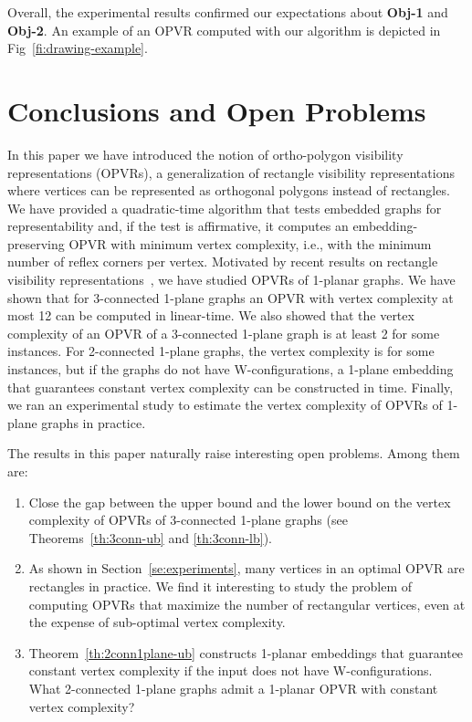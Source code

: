 \documentclass{article}
\newcommand{\opvr}{OPVR\xspace}
\begin{document}
Overall, the experimental results confirmed our expectations about {\bf Obj-1} and {\bf Obj-2}. 
An example of an \opvr computed with our algorithm is depicted in Fig~\ref{fi:drawing-example}.   



\section{Conclusions and Open Problems}\label{se:conclusions}

In this paper we have introduced the notion of ortho-polygon visibility representations (\opvr{s}), a generalization of rectangle visibility representations where vertices can be represented as orthogonal polygons instead of rectangles. We have provided a quadratic-time algorithm that tests embedded graphs for representability and, if the test is affirmative, it computes an embedding-preserving \opvr with minimum vertex complexity, i.e., with the minimum number of reflex corners per vertex. Motivated by recent results on rectangle visibility representations~\cite{SoCG}, we have studied \opvr{s} of 1-planar graphs. We have shown that for 3-connected 1-plane graphs an \opvr with vertex complexity at most 12 can be computed in linear-time. We also showed that the vertex complexity of an \opvr of a 3-connected 1-plane graph is at least 2 for some instances. For 2-connected 1-plane graphs, the vertex complexity is  for some instances, but if the graphs do not have W-configurations, a 1-plane embedding that guarantees constant vertex complexity can be constructed in  time. Finally, we ran an experimental study to estimate the vertex complexity of \opvr{s} of 1-plane graphs in practice.

The results in this paper naturally raise interesting open problems. Among them are: 

\begin{enumerate}
\item Close the gap between the upper bound and the lower bound on the vertex complexity of {\opvr}s of 3-connected 1-plane graphs (see Theorems~\ref{th:3conn-ub} and \ref{th:3conn-lb}). 
\item As shown in Section~\ref{se:experiments}, many vertices in an optimal \opvr are rectangles in practice. We find it interesting to study the problem of computing {\opvr}s that maximize the number of rectangular vertices, even at the expense of sub-optimal vertex complexity. 
\item Theorem~\ref{th:2conn1plane-ub} constructs 1-planar embeddings that guarantee constant vertex complexity if the input does not have W-configurations. What 2-connected 1-plane graphs admit a 1-planar {\opvr} with constant vertex complexity? 
\end{enumerate} 
\end{document}
